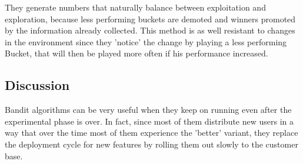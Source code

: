 \documentclass[main.tex]{subfiles}
\begin{document}
They generate numbers that naturally balance between exploitation and exploration, because less performing buckets are demoted and winners promoted by the information already collected. This method is as well resistant to changes in the environment since they 'notice' the change by playing a less performing Bucket, that will then be played more often if his performance increased.

\subsection{Discussion}
Bandit algorithms can be very useful when they keep on running even after the experimental phase is over. In fact, since most of them distribute new users in a way that over the time most of them experience the 'better' variant, they replace the deployment cycle for new features by rolling them out slowly to the customer base.
\end{document}
